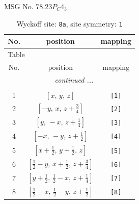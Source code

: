 \documentclass[fleqn,8pt]{jsarticle}
\begin{document}
\setcounter{MaxMatrixCols}{32}

\renewcommand{\tablename}{Table~}
\renewcommand{\figurename}{Figure~}
\begin{center}
\LARGE
MSG No. 78.23\quad$P_{C}4_{3}$
\end{center}
\renewcommand{\arraystretch}{1.2}
\begin{longtable}{ccc}
\caption{Wyckoff site: {\tt 8a}, site symmetry: {\tt 1}}
 \\
 \hline \hline
No. & position & mapping \\ \hline \endfirsthead

\multicolumn{2}{l}{\tablename\ \thetable{}} \\
 \hline \hline
No. & position & mapping \\ \hline \endhead

 \hline \hline
\multicolumn{2}{r}{\footnotesize\it continued ...} \\ \endfoot

 \hline \hline
\multicolumn{2}{r}{} \\ \endlastfoot

1 & $\left[ x,\, y,\, z \right]$ & {\tt [1]} \\ \hline
2 & $\left[ - y,\, x,\, z + \frac{3}{4} \right]$ & {\tt [2]} \\ \hline
3 & $\left[ y,\, - x,\, z + \frac{1}{4} \right]$ & {\tt [3]} \\ \hline
4 & $\left[ - x,\, - y,\, z + \frac{1}{2} \right]$ & {\tt [4]} \\ \hline
5 & $\left[ x + \frac{1}{2},\, y + \frac{1}{2},\, z \right]$ & {\tt [5]} \\ \hline
6 & $\left[ \frac{1}{2} - y,\, x + \frac{1}{2},\, z + \frac{3}{4} \right]$ & {\tt [6]} \\ \hline
7 & $\left[ y + \frac{1}{2},\, \frac{1}{2} - x,\, z + \frac{1}{4} \right]$ & {\tt [7]} \\ \hline
8 & $\left[ \frac{1}{2} - x,\, \frac{1}{2} - y,\, z + \frac{1}{2} \right]$ & {\tt [8]} \\
\end{longtable}
\end{document}
